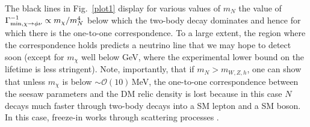 \documentclass[prd,a4paper,twocolumn,preprintnumbers,nofootinbib,superscriptaddress]{revtex4}
\newcommand{\aritra}[1]{\textcolor{bostonuniversityred}{#1}}
\begin{document}
	
	
The black lines in Fig.~\ref{plot1} display for various values of $m_N$ the value of $\Gamma_{\rm min,\chi\rightarrow \phi \nu}^{-1} \propto m_\chi/m_N^4$ below which the two-body decay dominates and hence for which there is the one-to-one correspondence.
To a large extent, the region where the correspondence holds 
predicts a neutrino line that we may hope to detect soon (except for $m_\chi$ well below GeV, where the experimental lower bound on the lifetime is less stringent).
Note, importantly, that if $m_{N}> m_{W,Z,h}$, one can show that unless $m_\chi$ is below $\sim \mathcal{O}(10)$\,MeV, the one-to-one correspondence between the seesaw parameters and the DM relic density is lost because in this case $N$ decays much faster through two-body decays into a SM lepton and a SM boson. In this case, freeze-in works through scattering processes \cite{Becker:2018rve,Bandyopadhyay:2020qpn,Chianese:2021toe,Cosme:2020mck,Chianese:2018dsz}.
	
\end{document}
